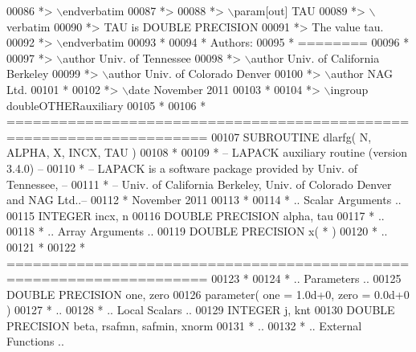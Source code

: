 \begin{DoxyCode}
00086 \textcolor{comment}{*> \(\backslash\)endverbatim}
00087 \textcolor{comment}{*>}
00088 \textcolor{comment}{*> \(\backslash\)param[out] TAU}
00089 \textcolor{comment}{*> \(\backslash\)verbatim}
00090 \textcolor{comment}{*>          TAU is DOUBLE PRECISION}
00091 \textcolor{comment}{*>          The value tau.}
00092 \textcolor{comment}{*> \(\backslash\)endverbatim}
00093 \textcolor{comment}{*}
00094 \textcolor{comment}{*  Authors:}
00095 \textcolor{comment}{*  ========}
00096 \textcolor{comment}{*}
00097 \textcolor{comment}{*> \(\backslash\)author Univ. of Tennessee }
00098 \textcolor{comment}{*> \(\backslash\)author Univ. of California Berkeley }
00099 \textcolor{comment}{*> \(\backslash\)author Univ. of Colorado Denver }
00100 \textcolor{comment}{*> \(\backslash\)author NAG Ltd. }
00101 \textcolor{comment}{*}
00102 \textcolor{comment}{*> \(\backslash\)date November 2011}
00103 \textcolor{comment}{*}
00104 \textcolor{comment}{*> \(\backslash\)ingroup doubleOTHERauxiliary}
00105 \textcolor{comment}{*}
00106 \textcolor{comment}{*  =====================================================================}
00107 \textcolor{keyword}{      SUBROUTINE }dlarfg( N, ALPHA, X, INCX, TAU )
00108 \textcolor{comment}{*}
00109 \textcolor{comment}{*  -- LAPACK auxiliary routine (version 3.4.0) --}
00110 \textcolor{comment}{*  -- LAPACK is a software package provided by Univ. of Tennessee,    --}
00111 \textcolor{comment}{*  -- Univ. of California Berkeley, Univ. of Colorado Denver and NAG Ltd..--}
00112 \textcolor{comment}{*     November 2011}
00113 \textcolor{comment}{*}
00114 \textcolor{comment}{*     .. Scalar Arguments ..}
00115       \textcolor{keywordtype}{INTEGER}            incx, n
00116       \textcolor{keywordtype}{DOUBLE PRECISION}   alpha, tau
00117 \textcolor{comment}{*     ..}
00118 \textcolor{comment}{*     .. Array Arguments ..}
00119       \textcolor{keywordtype}{DOUBLE PRECISION}   x( * )
00120 \textcolor{comment}{*     ..}
00121 \textcolor{comment}{*}
00122 \textcolor{comment}{*  =====================================================================}
00123 \textcolor{comment}{*}
00124 \textcolor{comment}{*     .. Parameters ..}
00125       \textcolor{keywordtype}{DOUBLE PRECISION}   one, zero
00126       parameter( one = 1.0d+0, zero = 0.0d+0 )
00127 \textcolor{comment}{*     ..}
00128 \textcolor{comment}{*     .. Local Scalars ..}
00129       \textcolor{keywordtype}{INTEGER}            j, knt
00130       \textcolor{keywordtype}{DOUBLE PRECISION}   beta, rsafmn, safmin, xnorm
00131 \textcolor{comment}{*     ..}
00132 \textcolor{comment}{*     .. External Functions ..}

\end{DoxyCode}
